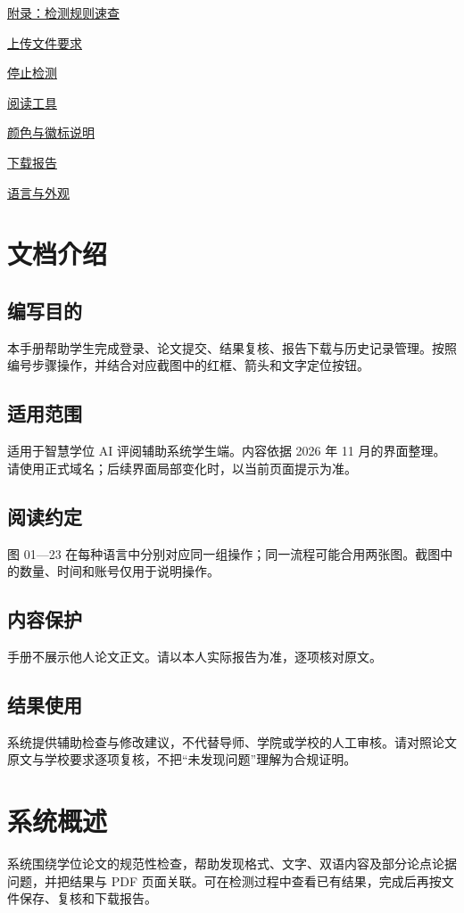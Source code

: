 \documentclass[12pt,a4paper]{article}
\begin{document}
\noindent\hyperref[zh:rules]{附录：检测规则速查}\dotfill\pageref{zh:rules}\par\vspace{5mm}
\par
\hyperref[zh:upload]{上传文件要求}\dotfill\pageref{zh:upload}\par
\hyperref[zh:progress]{停止检测}\dotfill\pageref{zh:progress}\par
\hyperref[zh:reading]{阅读工具}\dotfill\pageref{zh:reading}\par
\hyperref[zh:badges]{颜色与徽标说明}\dotfill\pageref{zh:badges}\par
\hyperref[zh:export]{下载报告}\dotfill\pageref{zh:export}\par
\hyperref[zh:settings]{语言与外观}\dotfill\pageref{zh:settings}\par
\clearpage\setcounter{section}{0}\section{文档介绍}\label{zh:intro}
\subsection*{编写目的}本手册帮助学生完成登录、论文提交、结果复核、报告下载与历史记录管理。按照编号步骤操作，并结合对应截图中的红框、箭头和文字定位按钮。\par
\subsection*{适用范围}适用于智慧学位 AI 评阅辅助系统学生端。内容依据 2026 年 11 月的界面整理。请使用正式域名；后续界面局部变化时，以当前页面提示为准。\par
\subsection*{阅读约定}图 01—23 在每种语言中分别对应同一组操作；同一流程可能合用两张图。截图中的数量、时间和账号仅用于说明操作。\par
\subsection*{内容保护}手册不展示他人论文正文。请以本人实际报告为准，逐项核对原文。\par
\subsection*{结果使用}系统提供辅助检查与修改建议，不代替导师、学院或学校的人工审核。请对照论文原文与学校要求逐项复核，不把“未发现问题”理解为合规证明。\par
\clearpage\section{系统概述}\label{zh:overview}
系统围绕学位论文的规范性检查，帮助发现格式、文字、双语内容及部分论点论据问题，并把结果与 PDF 页面关联。可在检测过程中查看已有结果，完成后再按文件保存、复核和下载报告。
\end{document}
